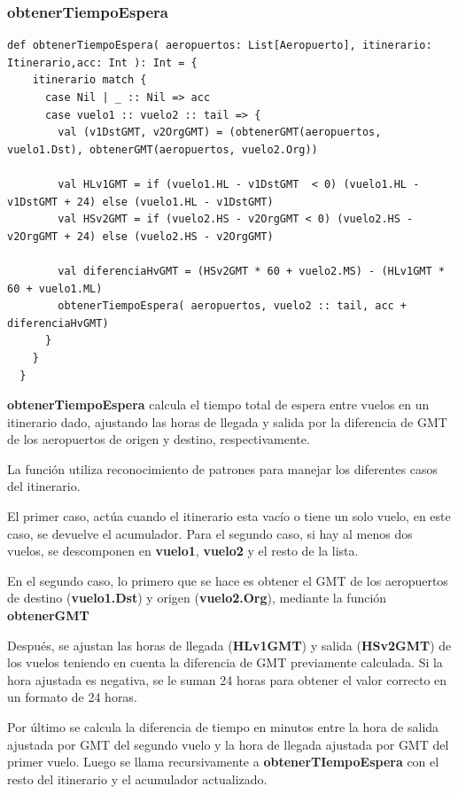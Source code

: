 \documentclass[letterpaper]{article}
\begin{document}
\subsubsection{obtenerTiempoEspera}
\begin{lstlisting}[caption={Función para obtener el tiempo de espera}, label={lst:obtenerTiempoEspera}, captionpos=b]
  def obtenerTiempoEspera( aeropuertos: List[Aeropuerto], itinerario: Itinerario,acc: Int ): Int = {
    itinerario match {
      case Nil | _ :: Nil => acc
      case vuelo1 :: vuelo2 :: tail => {
        val (v1DstGMT, v2OrgGMT) = (obtenerGMT(aeropuertos, vuelo1.Dst), obtenerGMT(aeropuertos, vuelo2.Org))
        
        val HLv1GMT = if (vuelo1.HL - v1DstGMT  < 0) (vuelo1.HL - v1DstGMT + 24) else (vuelo1.HL - v1DstGMT)
        val HSv2GMT = if (vuelo2.HS - v2OrgGMT < 0) (vuelo2.HS - v2OrgGMT + 24) else (vuelo2.HS - v2OrgGMT)

        val diferenciaHvGMT = (HSv2GMT * 60 + vuelo2.MS) - (HLv1GMT * 60 + vuelo1.ML) 
        obtenerTiempoEspera( aeropuertos, vuelo2 :: tail, acc + diferenciaHvGMT)
      }
    }
  }
\end{lstlisting}

\textbf{obtenerTiempoEspera} calcula el tiempo total de espera entre vuelos en un itinerario dado, ajustando las horas de llegada y salida por la diferencia de GMT de los aeropuertos de origen y destino, respectivamente.

La función utiliza reconocimiento de patrones para manejar los diferentes casos del itinerario.

El primer caso, actúa cuando el itinerario esta vacío o tiene un solo vuelo, en este caso, se devuelve el acumulador. Para el segundo caso, si hay al menos dos vuelos, se descomponen en \textbf{vuelo1}, \textbf{vuelo2} y el resto de la lista.

En el segundo caso, lo primero que se hace es obtener el GMT de los aeropuertos de destino (\textbf{vuelo1.Dst}) y origen (\textbf{vuelo2.Org}), mediante la función \textbf{obtenerGMT}

Después, se ajustan las horas de llegada (\textbf{HLv1GMT}) y salida (\textbf{HSv2GMT}) de los vuelos teniendo en cuenta la diferencia de GMT previamente calculada. Si la hora ajustada es negativa, se le suman 24 horas para obtener el valor correcto en un formato de 24 horas.

Por último se calcula la diferencia de tiempo en minutos entre la hora de salida ajustada por GMT del segundo vuelo y la hora de llegada ajustada por GMT del primer vuelo. Luego se llama recursivamente a \textbf{obtenerTIempoEspera} con el resto del itinerario y el acumulador actualizado.
\end{document}
